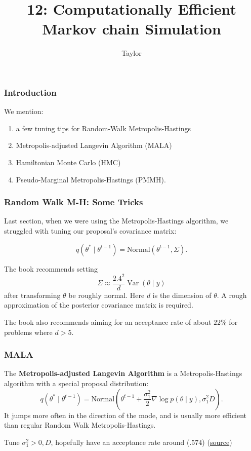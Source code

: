 \documentclass{beamer}
\title["12"]{12: Computationally Efficient Markov chain Simulation}
\author{Taylor}
\institute[UVA] 
{
University of Virginia \\
\medskip
\textit{} 
}
\date{}
\begin{document}

\begin{frame}
\titlepage 
\end{frame}

\begin{frame}
\frametitle{Introduction}

We mention:
\begin{enumerate}
\item a few tuning tips for Random-Walk Metropolis-Hastings
\item Metropolis-adjusted Langevin Algorithm (MALA)
\item Hamiltonian Monte Carlo (HMC)
\item Pseudo-Marginal Metropolis-Hastings (PMMH).
\end{enumerate}


\end{frame}

\begin{frame}
\frametitle{Random Walk M-H: Some Tricks}

Last section, when we were using the Metropolis-Hastings algorithm, we struggled with tuning our proposal's covariance matrix:

$$
q(\theta^* \mid \theta^{t-1}) = \text{Normal}(\theta^{t-1}, \Sigma).
$$

The book recommends setting 
$$
\Sigma \approx \frac{2.4^2}{d} \operatorname{Var}(\theta \mid y)
$$
after transforming $\theta$ be roughly normal. Here $d$ is the dimension of $\theta$. A rough approximation of the posterior covariance matrix is required.
\newline

The book also recommends aiming for an acceptance rate of about $22\%$ for problems where $d > 5$. 


\end{frame}

\begin{frame}
\frametitle{MALA}

The {\bf Metropolis-adjusted Langevin Algorithm} is a Metropolis-Hastings algorithm with a special proposal distribution:
$$
q(\theta^* \mid \theta^{t-1}) = \text{Normal}(\theta^{t-1} + \frac{\sigma_1^2}{2} \nabla \log p(\theta \mid y) , \sigma_1^2 D).
$$
It jumps more often in the direction of the mode, and is usually more efficient than regular Random Walk Metropolis-Hastings.
\newline

Tune $\sigma_1^2 >0, D$, hopefully have an acceptance rate around ($.574$) (\href{https://pdfs.semanticscholar.org/b410/3e9b1d7e1699dd0d606b08c34394e2aff72d.pdf}{source})


\end{frame}
\end{document}
